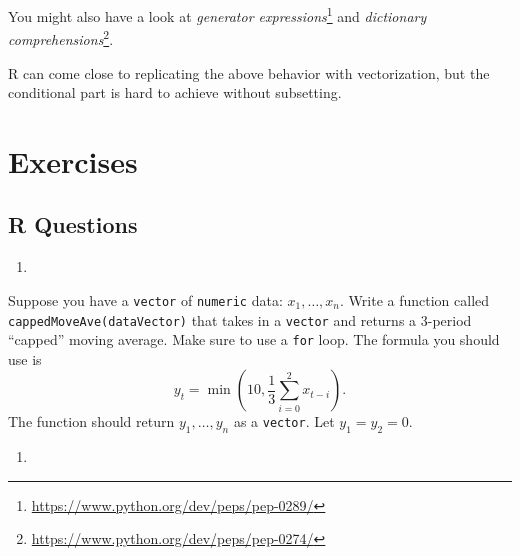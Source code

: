 \documentclass[12pt,krantz2]{krantz}
\makeatletter
\newenvironment{Shaded}{\begin{snugshade}}{\end{snugshade}}
\newcommand{\CommentTok}[1]{\textcolor[rgb]{0.37,0.37,0.37}{\textit{#1}}}
\newcommand{\DecValTok}[1]{\textcolor[rgb]{0.06,0.06,0.06}{#1}}
\newcommand{\KeywordTok}[1]{\textcolor[rgb]{0.27,0.27,0.27}{\textbf{#1}}}
\newcommand{\NormalTok}[1]{#1}
\newcommand{\OperatorTok}[1]{\textcolor[rgb]{0.43,0.43,0.43}{\textbf{#1}}}
\newcommand{\StringTok}[1]{\textcolor[rgb]{0.5,0.5,0.5}{#1}}
\renewcommand{\href}[2]{#2\footnote{\url{#1}}}
\newenvironment{kframe}{%
\medskip{}
\setlength{\fboxsep}{.8em}
 \def\at@end@of@kframe{}%
 \ifinner\ifhmode%
  \def\at@end@of@kframe{\end{minipage}}%
  \begin{minipage}{\columnwidth}%
 \fi\fi%
 \def\FrameCommand##1{\hskip\@totalleftmargin \hskip-\fboxsep
 \colorbox{shadecolor}{##1}\hskip-\fboxsep
     \hskip-\linewidth \hskip-\@totalleftmargin \hskip\columnwidth}%
 \MakeFramed {\advance\hsize-\width
   \@totalleftmargin\z@ \linewidth\hsize
   \@setminipage}}%
 {\par\unskip\endMakeFramed%
 \at@end@of@kframe}
\renewenvironment{Shaded}{\begin{kframe}}{\end{kframe}}
\makeatother
\begin{document}
You might also have a look at \href{https://www.python.org/dev/peps/pep-0289/}{\emph{generator expressions}} and \href{https://www.python.org/dev/peps/pep-0274/}{\emph{dictionary comprehensions}}.

R can come close to replicating the above behavior with vectorization, but the conditional part is hard to achieve without subsetting.

\begin{Shaded}
\end{Shaded}

\hypertarget{exercises-9}{%
\section{Exercises}\label{exercises-9}}

\hypertarget{r-questions-8}{%
\subsection{R Questions}\label{r-questions-8}}

\begin{enumerate}
\def\labelenumi{\arabic{enumi}.}
\item
\end{enumerate}

Suppose you have a \texttt{vector} of \texttt{numeric} data: \(x_1, \ldots, x_n\). Write a function called \texttt{cappedMoveAve(dataVector)} that takes in a \texttt{vector} and returns a 3-period ``capped'' moving average. Make sure to use a \texttt{for} loop. The formula you should use is
\begin{equation} 
y_t = \min\left(10, \frac{1}{3}\sum_{i=0}^2x_{t-i} \right).
\end{equation}
The function should return \(y_1, \ldots, y_n\) as a \texttt{vector}. Let \(y_1 = y_2 = 0\).

\begin{enumerate}
\def\labelenumi{\arabic{enumi}.}
\setcounter{enumi}{1}
\item
\end{enumerate}
\end{document}
